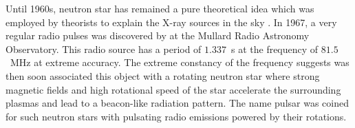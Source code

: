 Until 1960s, neutron star has remained a pure theoretical idea which was employed by theorists to explain the X-ray sources in the sky \citep{1964Natur.201.1308M} . 
In 1967, a very regular radio pulses was discovered by \citet{1969Natur.224..472H} at the Mullard Radio Astronomy Observatory.
This radio source has a period of $1.337$~s at the frequency of $81.5$~MHz at extreme accuracy. 
The extreme constancy of the frequency suggests was then soon associated this object with a rotating neutron star \citep{1968Natur.218..731G} where strong magnetic fields and high rotational speed of the star accelerate the surrounding plasmas and lead to a beacon-like radiation pattern.
The name pulsar was coined for such neutron stars with pulsating radio emissions powered by their rotations.
%
\begin{figure}[h]
  \centering
\end{figure}
